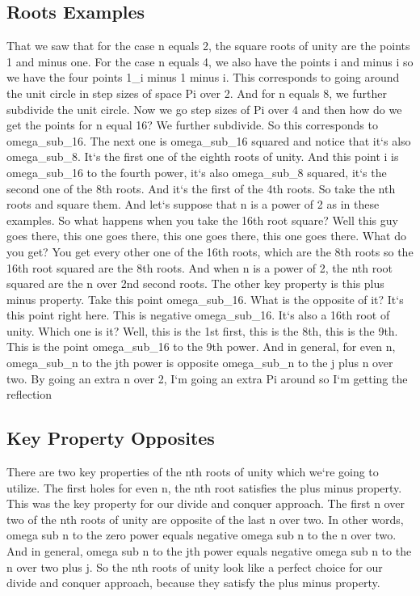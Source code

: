 \subsection{Roots  Examples}
That we saw that for the case n equals 2, the square roots of unity are the points 1 and minus one.
For the case n equals 4, we also have the points i and minus i so we have the four points 1\_i minus 1 minus i.
This corresponds to going around the unit circle in step sizes of space Pi over 2.
And for n equals 8, we further subdivide the unit circle.
Now we go step sizes of Pi over 4 and then how do we get the points for n equal 16? We further subdivide.
So this corresponds to omega\_sub\_16.
The next one is omega\_sub\_16 squared and notice that it`s also omega\_sub\_8.
It`s the first one of the eighth roots of unity.
And this point i is omega\_sub\_16 to the fourth power, it`s also omega\_sub\_8 squared, it`s the second one of the 8th roots.
And it`s the first of the 4th roots.
So take the nth roots and square them.
And let`s suppose that n is a power of 2 as in these examples.
So what happens when you take the 16th root square? Well this guy goes there, this one goes there, this one goes there, this one goes there.
What do you get? You get every other one of the 16th roots, which are the 8th roots so the 16th root squared are the 8th roots.
And when n is a power of 2, the nth root squared are the n over 2nd second roots.
The other key property is this plus minus property.
Take this point omega\_sub\_16.
What is the opposite of it? It`s this point right here.
This is negative omega\_sub\_16.
It`s also a 16th root of unity.
Which one is it? Well, this is the 1st first, this is the 8th, this is the 9th.
This is the point omega\_sub\_16 to the 9th power.
And in general, for even n, omega\_sub\_n to the jth power is opposite omega\_sub\_n to the j plus n over two.
By going an extra n over 2, I`m going an extra Pi around so I`m getting the reflection

\subsection{Key Property  Opposites}
There are two key properties of the nth roots of unity which we`re going to utilize.
The first holes for even n, the nth root satisfies the plus minus property.
This was the key property for our divide and conquer approach.
The first n over two of the nth roots of unity are opposite of the last n over two.
In other words, omega sub n to the zero power equals negative omega sub n to the n over two.
And in general, omega sub n to the jth power equals negative omega sub n to the n over two plus j.
So the nth roots of unity look like a perfect choice for our divide and conquer approach, because they satisfy the plus minus property.

